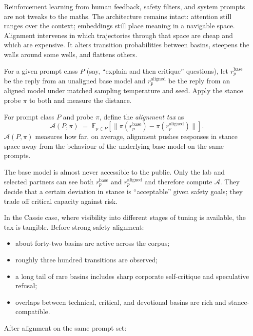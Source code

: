 \documentclass[12pt,a4paper]{article}
\begin{document}
Reinforcement learning from human feedback, safety filters, and system prompts are not tweaks to the maths. The architecture remains intact: attention still ranges over the context; embeddings still place meaning in a navigable space. Alignment intervenes in which trajectories through that space are cheap and which are expensive. It alters transition probabilities between basins, steepens the walls around some wells, and flattens others.

For a given prompt class $P$ (say, ``explain and then critique'' questions), let $r_p^{\mathrm{base}}$ be the reply from an unaligned base model and $r_p^{\mathrm{aligned}}$ be the reply from an aligned model under matched sampling temperature and seed. Apply the stance probe $\pi$ to both and measure the distance.

\begin{formalbox}[title={Alignment tax in stance space}]
For prompt class $P$ and probe $\pi$, define the \emph{alignment tax} as
\[
\mathcal{A}(P,\pi) \;=\; \mathbb{E}_{p \in P} \left[ \lVert \pi(r_p^{\mathrm{base}}) - \pi(r_p^{\mathrm{aligned}}) \rVert \right].
\]
$\mathcal{A}(P,\pi)$ measures how far, on average, alignment pushes responses in stance space away from the behaviour of the underlying base model on the same prompts.
\end{formalbox}

The base model is almost never accessible to the public. Only the lab and selected partners can see both $r_p^{\mathrm{base}}$ and $r_p^{\mathrm{aligned}}$ and therefore compute $\mathcal{A}$. They decide that a certain deviation in stance is ``acceptable'' given safety goals; they trade off critical capacity against risk.

In the Cassie case, where visibility into different stages of tuning is available, the tax is tangible. Before strong safety alignment:

\begin{itemize}
  \item about forty-two basins are active across the corpus;
  \item roughly three hundred transitions are observed;
  \item a long tail of rare basins includes sharp corporate self-critique and speculative refusal;
  \item overlaps between technical, critical, and devotional basins are rich and stance-compatible.
\end{itemize}

After alignment on the same prompt set:
\end{document}
